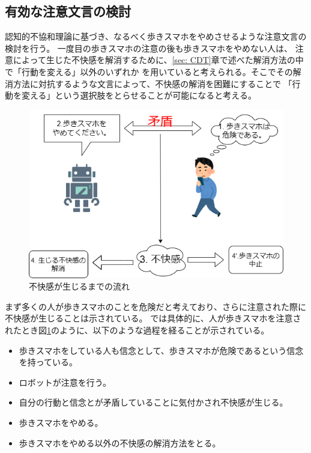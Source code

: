 \documentclass{kuisthesis}
\begin{document}
\begin{itemize}
\end{itemize}
\vspace{5mm}






\subsection{有効な注意文言の検討}
認知的不協和理論に基づき、なるべく歩きスマホをやめさせるような注意文言の検討を行う。
一度目の歩きスマホの注意の後も歩きスマホをやめない人は、
注意によって生じた不快感を解消するために、\ref{sec: CDT}章で述べた解消方法の中で「行動を変える」以外のいずれか
を用いていると考えられる。そこでその解消方法に対抗するような文言によって、不快感の解消を困難にすることで
「行動を変える」という選択肢をとらせることが可能になると考える。
\label{sec: dissonance}
\begin{figure}[htbp]
  
  \includegraphics[width=13cm]{img/CDT.png}
  \caption{不快感が生じるまでの流れ}
  \label{fig: dissonance}
\end{figure}
まず多くの人が歩きスマホのことを危険だと考えており、さらに注意された際に不快感が生じることは示されている。
\cite{Schneider2022}では具体的に、人が歩きスマホを注意されたとき図\ref{fig: dissonance}のように、以下のような過程を経ることが示されている。
\begin{itemize}
  \item[(1)] 歩きスマホをしている人も信念として、歩きスマホが危険であるという信念を持っている。
  \item[(2)] ロボットが注意を行う。
  \item[(3)] 自分の行動と信念とが矛盾していることに気付かされ不快感が生じる。
  \item[(4)] 歩きスマホをやめる。
  \item[(4')]歩きスマホをやめる以外の不快感の解消方法をとる。
  \label{item: dissonance}
\end{itemize}
\end{document}
